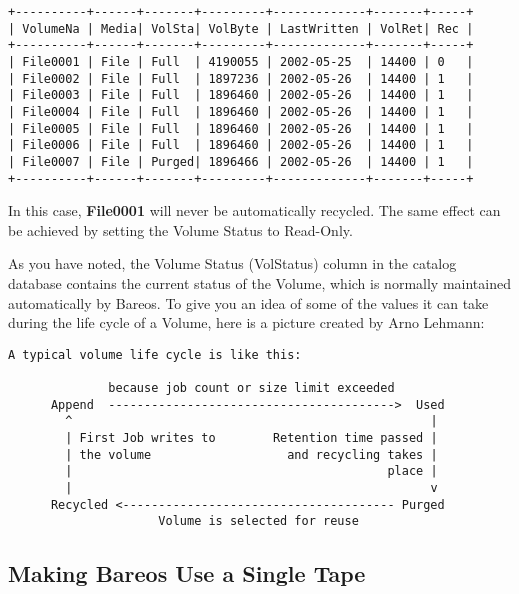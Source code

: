 \footnotesize
\begin{verbatim}
+----------+------+-------+---------+-------------+-------+-----+
| VolumeNa | Media| VolSta| VolByte | LastWritten | VolRet| Rec |
+----------+------+-------+---------+-------------+-------+-----+
| File0001 | File | Full  | 4190055 | 2002-05-25  | 14400 | 0   |
| File0002 | File | Full  | 1897236 | 2002-05-26  | 14400 | 1   |
| File0003 | File | Full  | 1896460 | 2002-05-26  | 14400 | 1   |
| File0004 | File | Full  | 1896460 | 2002-05-26  | 14400 | 1   |
| File0005 | File | Full  | 1896460 | 2002-05-26  | 14400 | 1   |
| File0006 | File | Full  | 1896460 | 2002-05-26  | 14400 | 1   |
| File0007 | File | Purged| 1896466 | 2002-05-26  | 14400 | 1   |
+----------+------+-------+---------+-------------+-------+-----+
\end{verbatim}
\normalsize

In this case, {\bf File0001} will never be automatically recycled. The same
effect can be achieved by setting the Volume Status to Read-Only.

As you have noted, the Volume Status (VolStatus) column in the
catalog database contains the current status of the Volume, which
is normally maintained automatically by Bareos. To give you an
idea of some of the values it can take during the life cycle of
a Volume, here is a picture created by Arno Lehmann:

\footnotesize
\begin{verbatim}
A typical volume life cycle is like this:

              because job count or size limit exceeded
      Append  ---------------------------------------->  Used
        ^                                                  |
        | First Job writes to        Retention time passed |
        | the volume                   and recycling takes |
        |                                            place |
        |                                                  v
      Recycled <-------------------------------------- Purged
                     Volume is selected for reuse

\end{verbatim}
\normalsize


\subsection{Making Bareos Use a Single Tape}
\label{singletape}

